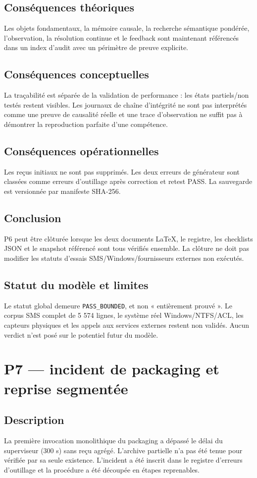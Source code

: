 \documentclass[11pt,a4paper]{article}
\begin{document}
\subsection{Conséquences théoriques}
Les objets fondamentaux, la mémoire causale, la recherche sémantique pondérée, l’observation, la résolution continue et le feedback sont maintenant référencés dans un index d’audit avec un périmètre de preuve explicite.
\subsection{Conséquences conceptuelles}
La traçabilité est séparée de la validation de performance : les états partiels/non testés restent visibles. Les journaux de chaîne d’intégrité ne sont pas interprétés comme une preuve de causalité réelle et une trace d’observation ne suffit pas à démontrer la reproduction parfaite d’une compétence.
\subsection{Conséquences opérationnelles}
Les reçus initiaux ne sont pas supprimés. Les deux erreurs de générateur sont classées comme erreurs d’outillage après correction et retest PASS. La sauvegarde est versionnée par manifeste SHA-256.
\subsection{Conclusion}
P6 peut être clôturée lorsque les deux documents LaTeX, le registre, les checklists JSON et le snapshot référencé sont tous vérifiés ensemble. La clôture ne doit pas modifier les statuts d’essais SMS/Windows/fournisseurs externes non exécutés.
\subsection{Statut du modèle et limites}
Le statut global demeure \texttt{PASS\_BOUNDED}, et non « entièrement prouvé ». Le corpus SMS complet de 5 574 lignes, le système réel Windows/NTFS/ACL, les capteurs physiques et les appels aux services externes restent non validés. Aucun verdict n’est posé sur le potentiel futur du modèle.



\section{P7 — incident de packaging et reprise segmentée}
\subsection{Description}
La première invocation monolithique du packaging a dépassé le délai du superviseur (300 s) sans reçu agrégé. L'archive partielle n'a pas été tenue pour vérifiée par sa seule existence. L'incident a été inscrit dans le registre d'erreurs d'outillage et la procédure a été découpée en étapes reprenables.
\end{document}
